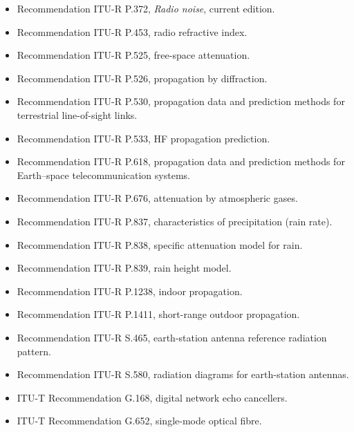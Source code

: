 \begin{itemize}[leftmargin=1.5em,itemindent=-1.5em,itemsep=1.5pt plus 1pt,parsep=0pt,topsep=4pt,label={}]
\item Recommendation ITU-R P.372, \emph{Radio noise}, current edition.
\item Recommendation ITU-R P.453, radio refractive index.
\item Recommendation ITU-R P.525, free-space attenuation.
\item Recommendation ITU-R P.526, propagation by diffraction.
\item Recommendation ITU-R P.530, propagation data and prediction methods for terrestrial line-of-sight links.
\item Recommendation ITU-R P.533, HF propagation prediction.
\item Recommendation ITU-R P.618, propagation data and prediction methods for Earth--space telecommunication systems.
\item Recommendation ITU-R P.676, attenuation by atmospheric gases.
\item Recommendation ITU-R P.837, characteristics of precipitation (rain rate).
\item Recommendation ITU-R P.838, specific attenuation model for rain.
\item Recommendation ITU-R P.839, rain height model.
\item Recommendation ITU-R P.1238, indoor propagation.
\item Recommendation ITU-R P.1411, short-range outdoor propagation.
\item Recommendation ITU-R S.465, earth-station antenna reference radiation pattern.
\item Recommendation ITU-R S.580, radiation diagrams for earth-station antennas.
\item ITU-T Recommendation G.168, digital network echo cancellers.
\item ITU-T Recommendation G.652, single-mode optical fibre.

\end{itemize}
